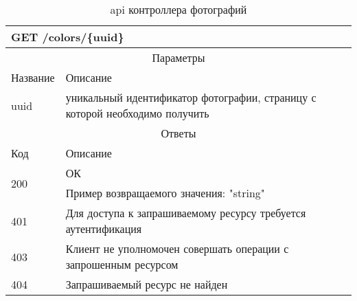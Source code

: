 \begin{table}[H]
  \caption{api контроллера фотографий}\label{api-photos-table}
  \begin{tabular}{|p{6cm}|p{10cm}|}
  \hline \multicolumn{2}{|l|}{GET /colors/\{uuid\}} \\
  \hline \multicolumn{2}{|c|}{Параметры} \\
  \hline Название & Описание \\
  \hline uuid & уникальный идентификатор фотографии, страницу с которой необходимо получить \\
  \hline \multicolumn{2}{|c|}{Ответы} \\
  \hline Код & Описание \\
  \hline \multirow{2}{=}{200} & ОК \\
   & Пример возвращаемого значения: "string" \\
  \hline 401 & Для доступа к запрашиваемому ресурсу требуется аутентификация \\
  \hline 403 & Клиент не уполномочен совершать операции с запрошенным ресурсом \\
  \hline 404 & Запрашиваемый ресурс не найден \\
  \hline
  \end{tabular}
\end{table}


